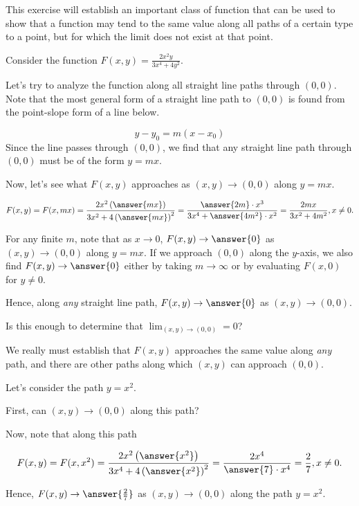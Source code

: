 \documentclass{ximera}
\author{Jim Talamo}
\newcommand{\point}[1]{\left(#1\right)} %
\newcommand{\Lim}[2]{\lim_{\point{#1} \to \point{#2}}}
\begin{document}
\begin{exercise}
This exercise will establish an important class of function that can be used to show that a function may tend to the same value along all paths of a certain type to a point, but for which the limit does not exist at that point.

Consider the function $F(x,y) = \frac{2x^2y}{3x^4+4y^2}$.

Let's try to analyze the function along all straight line paths through $(0,0)$.  Note that the most general form of a straight line path to $(0,0)$ is found from the point-slope form of a line below.

\[
y-y_0=m(x-x_0)
\] 
Since the line passes through $(0,0)$, we find that any straight line path through $(0,0)$ must be of the form $y=mx$.

Now, let's see what $F(x,y)$ approaches as $(x,y) \to (0,0)$ along $y=mx$.

\[F(x,y) = F(x,mx) = \frac{2x^2\left(\answer{mx}\right)}{3x^2+4\left(\answer{mx}\right)^2} = \frac{\answer{2m} \cdot x^3 }{3x^4 + \answer{4m^2}\cdot x^2} = \frac{2mx}{3x^2+4m^2}, x \neq 0.
\]
 
 For any finite $m$, note that as $x \to 0$, $F(x,y) \to \answer{0}$ as $(x,y) \to (0,0)$ along $y=mx$.  If we approach $(0,0)$ along the $y$-axis, we also find $F(x,y) \to \answer{0}$ either by taking $m \to \infty$ or by evaluating $F(x,0)$ for $y \neq 0$.
 
 Hence, along \emph{any} straight line path, $F(x,y) \to \answer{0}$ as $(x,y) \to (0,0)$.
 
 Is this enough to determine that $\Lim{x,y}{0,0} = 0$? 
 
 \begin{exercise}
We really must establish that $F(x,y)$ approaches the same value along \emph{any} path, and there are other paths along which $(x,y)$ can approach $(0,0)$.

Let's consider the path $y=x^2$.  

First, can $(x,y) \to (0,0)$ along this path?  

Now, note that along this path

\[
F(x,y) = F(x,x^2) = \frac{2x^2\left(\answer{x^2}\right)}{3x^4+4\left(\answer{x^2}\right)^2} = \frac{2x^4}{\answer{7} \cdot x^4} = \frac{2}{7} , x \neq 0.
\]

 Hence, $F(x,y) \to \answer{\frac{2}{7}}$ as $(x,y) \to (0,0)$ along the path $y=x^2$.


\end{exercise}
\end{exercise}
\end{document}
